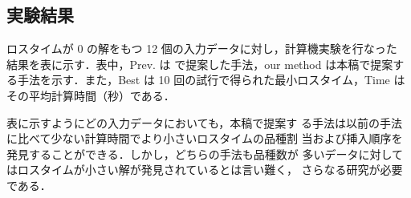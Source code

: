 \documentclass[a4j]{jarticle}
\begin{document}
\begin{Abstract}
 \section{実験結果}

 ロスタイムが 0 の解をもつ 12 個の入力データに対し，計算機実験を行なった
 結果を表に示す．表中，Prev. は \cite{bib:pre-method} %
 で提案した手法，our method は本稿で提案する手法を示す．また，Best は 10 %
 回の試行で得られた最小ロスタイム，Time はその平均計算時間（秒）である．

 表に示すようにどの入力データにおいても，本稿で提案す
 る手法は以前の手法に比べて少ない計算時間でより小さいロスタイムの品種割
 当および挿入順序を発見することができる．しかし，どちらの手法も品種数が
 多いデータに対してはロスタイムが小さい解が発見されているとは言い難く，
 さらなる研究が必要である．
 

\end{Abstract}
\end{document}

